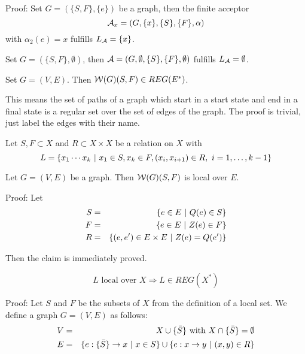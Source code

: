 Proof: Set $G = (\{S,F\}, \{e\})$ be a graph, then the finite acceptor
\[\mbox{$\mathcal{A}$}_x = (G, \{x\}, \{S\}, \{F\}, \alpha)\] with $\alpha_2(e) = x$ fulfills
$\mbox{$L_{\mathcal{A}}$} = \{x\}$.

Set $G = (\{S,F\}, \emptyset)$, then $\mbox{$\mathcal{A}$} = (G, \emptyset, \{S\}, \{F\},
\emptyset)$ fulfills $\mbox{$L_{\mathcal{A}}$} = \emptyset$.

\begin{lemma}
Set $G = (V, E)$. Then $\mbox{$\mathcal{W}(G)$}(S,F) \in REG(E^*)$.
\end{lemma}

This means the set of paths of a graph which start in a start state and end in a
final state is a regular set over the set of edges of the graph. The proof is
trivial, just label the edges with their name.

\begin{definition}
Let $S, F \subset X$ and $R \subset X \times X$ be a relation on $X$ with \[ L =
\{ x_1 \cdots x_k \ |\  x_1 \in S, x_k \in F, (x_i, x_{i+1}) \in R,\ i = 1,
\ldots, k - 1 \} \]
\end{definition}

\begin{lemma}
Let $G = (V, E)$ be a graph. Then $\mbox{$\mathcal{W}(G)$}(S, F)$ is local over $E$.
\end{lemma}

Proof: Let \begin{eqnarray*}
S & = & \{ e \in E \ |\  Q(e) \in S \} \\ 
F & = & \{ e \in E \ |\  Z(e) \in F \} \\
R & = & \{ (e, e') \in E \times E \ |\  Z(e) = Q(e') \} 
\end{eqnarray*}

Then the claim is immediately proved.

\begin{lemma}
\[ L \mbox{ local over } X \Rightarrow L \in REG(X^*) \]
\end{lemma}

Proof: Let $S$ and $F$ be the subsets of $X$ from the definition of a local
set. We define a graph $G = (V, E)$ as follows:
\begin{eqnarray*}
V & = & X \cup \{ \bar{S} \} \mbox{ with } X \cap \{ \bar{S} \} = \emptyset \\
E & = & \{ e : \{ \bar{S} \} \to x \ |\  x \in S \} \cup \{ e : x \to y \ |\ 
(x, y) \in R \}
\end{eqnarray*}

